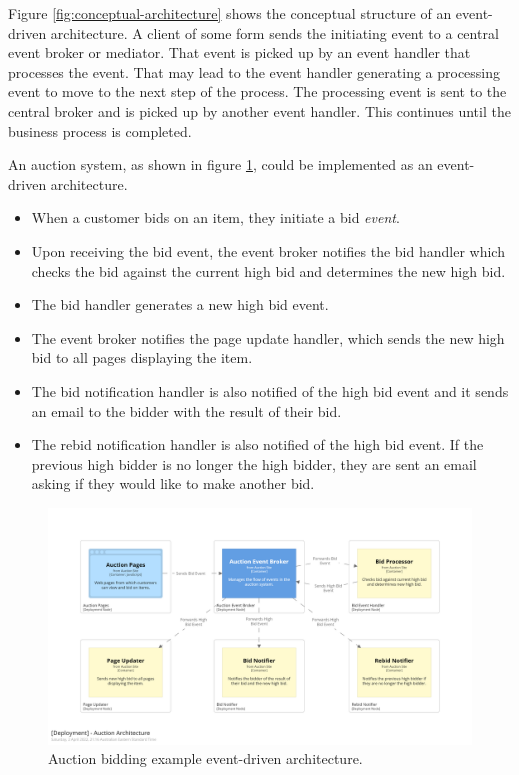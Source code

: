 Figure \ref{fig:conceptual-architecture} shows the conceptual structure of an event-driven architecture.
A client of some form sends the initiating event to a central event broker or mediator.
That event is picked up by an event handler that processes the event.
That may lead to the event handler generating a processing event to move to the next step of the process.
The processing event is sent to the central broker and is picked up by another event handler.
This continues until the business process is completed.

An auction system, as shown in figure \ref{fig:auction-architecture}, could be implemented as an event-driven architecture.
\begin{itemize}[nosep]
    \item When a customer bids on an item, they initiate a bid \emph{event}.
    \item Upon receiving the bid event, the event broker notifies the bid handler which checks the bid against the current high bid and determines the new high bid.
    \item The bid handler generates a new high bid event.
    \item The event broker notifies the page update handler, which sends the new high bid to all pages displaying the item.
    \item The bid notification handler is also notified of the high bid event and it sends an email to the bidder with the result of their bid.
    \item The rebid notification handler is also notified of the high bid event.
             If the previous high bidder is no longer the high bidder, they are sent an email asking if they would like to make another bid.
\end{itemize}

\begin{figure}[h!]
    \begin{adjustwidth}{-10mm}{-10mm}
        \centering
        \includegraphics[trim=195 195 195 195,clip,width=0.95\paperwidth]{diagrams/auction-architecture.png}
    \end{adjustwidth}
    \caption{Auction bidding example event-driven architecture.}
    \label{fig:auction-architecture}
\end{figure}

